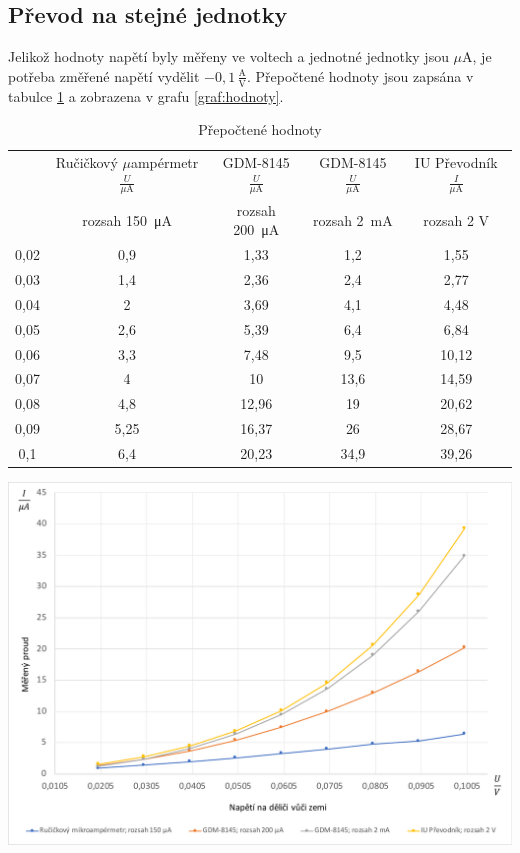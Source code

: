 \documentclass[a4paper,12pt]{article}   %
\newcommand{\tmu}{$\mu$}
\begin{document}
\subsection{Převod na stejné jednotky}
Jelikož hodnoty napětí byly měřeny ve voltech a jednotné jednotky jsou \tmu A, je potřeba změřené napětí vydělit $-0,1\,\frac{\textrm{A}}{\textrm{V}}$. Přepočtené hodnoty jsou zapsána v tabulce \ref{tab:prepocteno} a zobrazena v grafu \ref{graf:hodnoty}.

\begin{table}[h!]
    \begin{tabular}{|c|c|c|c|c|}
        \hline
        \rule{0pt}{2.5ex}
        \multirow{2}{*}{Napětí na děliči $\frac{U}{\textrm{V}}$}& Ručičkový \tmu ampérmetr$\frac{U}{\mu\textrm{A}}$ 	&GDM-8145 $\frac{U}{\mu\textrm{A}}$	&GDM-8145 $\frac{U}{\mu\textrm{A}}$	&IU Převodník $\frac{I}{\mu\textrm{A}}$  \\[.7ex]
        & rozsah  150~μA & rozsah 200~μA & rozsah  2~mA & rozsah  2 V\\\hline\hline
        0,02    &0,9    &1,33   &1,2    &1,55\\\hline
        0,03    &1,4    &2,36   &2,4    &2,77\\\hline
        0,04    &2      &3,69   &4,1    &4,48\\\hline
        0,05    &2,6    &5,39   &6,4    &6,84\\\hline
        0,06    &3,3    &7,48   &9,5    &10,12\\\hline
        0,07    &4      &10     &13,6   &14,59\\\hline
        0,08    &4,8    &12,96  &19     &20,62\\\hline
        0,09    &5,25   &16,37  &26     &28,67\\\hline
        0,1     &6,4    &20,23  &34,9   &39,26\\\hline
    \end{tabular}
    \caption{Přepočtené hodnoty}
    \label{tab:prepocteno}
\end{table}

\begin{graf}[h!]
    \centering
    \includegraphics[width=.8\textwidth]{graf_namereno.pdf}
    \caption{Naměřené hodnoty přepočtené na \tmu A}
    \label{graf:hodnoty}
\end{graf}
\end{document}
